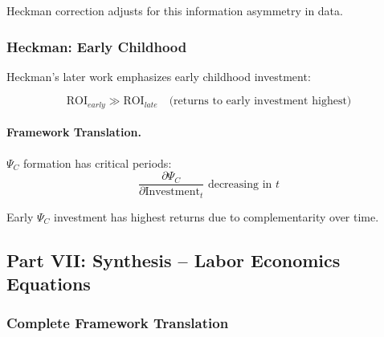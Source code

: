 Heckman correction adjusts for this information asymmetry in data.

\subsubsection{Heckman: Early Childhood}

Heckman's later work emphasizes early childhood investment:

\begin{equation}
\boxed{
\text{ROI}_{early} \gg \text{ROI}_{late} \quad \text{(returns to early investment highest)}
}
\label{eq:heckman-early}
\end{equation}

\paragraph{Framework Translation.}
$\Psi_C$ formation has critical periods:
\begin{equation}
\frac{\partial \Psi_C}{\partial \text{Investment}_t} \text{ decreasing in } t
\end{equation}

Early $\Psi_C$ investment has highest returns due to complementarity over time.

\subsection{Part VII: Synthesis – Labor Economics Equations}

\subsubsection{Complete Framework Translation}

